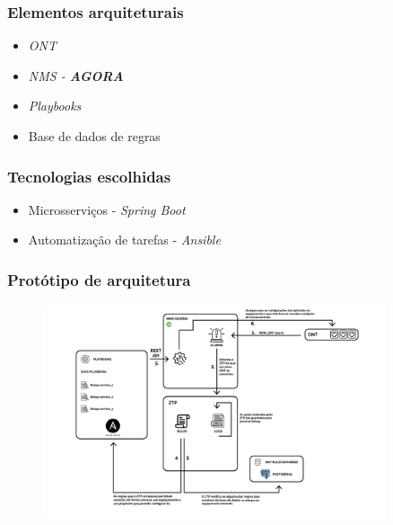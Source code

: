 \begin{frame}
    \frametitle{\checkmark \hspace{1mm} Elementos arquiteturais}
    \begin{itemize}
        \item \textit{ONT}
        \item \textit{NMS - \textbf{AGORA}}
        \item \textit{Playbooks}
        \item Base de dados de regras
    \end{itemize}
\end{frame}

\begin{frame}
    \frametitle{\checkmark \hspace{1mm} Tecnologias escolhidas}
    \begin{itemize}
        \item Microsserviços - \textit{Spring Boot}
        \item Automatização de tarefas - \textit{Ansible}
    \end{itemize}
\end{frame}

\begin{frame}
    \frametitle{Protótipo de arquitetura}
    \begin{figure}
        \includegraphics[width=0.9\textwidth]{./assets/prototipo_de_arquitetura/arquitetura_solucao.png}
    \end{figure}    
\end{frame}    